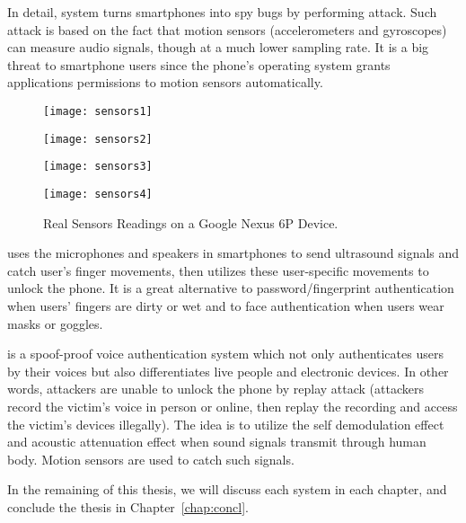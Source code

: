 

In detail, {\systemName} system turns smartphones into spy bugs by performing {\attackName} attack. Such attack is  based on the fact that motion sensors (accelerometers and gyroscopes) can measure audio signals, though at a much lower sampling rate. It is a big threat to smartphone users since the phone's operating system grants applications permissions to motion sensors automatically. 

\begin{landscape}
	\begin{figure*}[h]
		\begin{minipage}[t]{0.25\textwidth}
			\texttt{[image: sensors1]}
		\end{minipage}
		\hspace{.60in}
		\begin{minipage}[t]{0.25\textwidth}
			\texttt{[image: sensors2]}
		\end{minipage}
		\hspace{.60in}
		\begin{minipage}[t]{0.25\textwidth}
			\texttt{[image: sensors3]}
		\end{minipage}  
		\hspace{.60in}
		\begin{minipage}[t]{0.25\textwidth}
			\texttt{[image: sensors4]}
		\end{minipage}  
		\caption{Real Sensors Readings on a Google Nexus 6P Device.}
		\label{fig:sensors}
	\end{figure*}
\end{landscape}

{\uu} uses the microphones and speakers in smartphones to send ultrasound signals and catch user’s finger movements, then utilizes these user-specific movements to unlock the phone. It is a great alternative to password/fingerprint authentication when users' fingers are dirty or wet and to face authentication when users wear masks or goggles.
%


{\shortname} is a spoof-proof voice authentication system which not only authenticates users by their voices but also differentiates live people and electronic devices. In other words, attackers are unable to unlock the phone by replay attack (attackers record the victim's voice in person or online, then replay the recording and access the victim's devices illegally). The idea is to utilize the self demodulation effect and acoustic attenuation effect when sound signals transmit through human body. Motion sensors are used to catch such signals.


In the remaining of this thesis, we will discuss each system in each chapter, and conclude the thesis in Chapter~\ref{chap:concl}.


